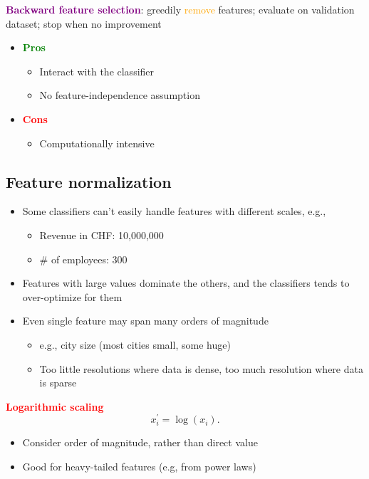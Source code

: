 \documentclass[11pt]{article}
\begin{document}
\textbf{\textcolor{purple}{Backward feature selection}}: greedily \textcolor{orange}{remove} features; evaluate on validation dataset; stop when no improvement
\begin{itemize}
	\item \textbf{\textcolor{green}{Pros}}
		\begin{itemize}
			\item Interact with the classifier
			\item No feature-independence assumption
		\end{itemize}
	\item \textcolor{red}{\textbf{Cons}}
		\begin{itemize}
			\item Computationally intensive
		\end{itemize}
\end{itemize}

\newpage
\subsection*{Feature normalization}

\begin{itemize}
	\item Some classifiers can't easily handle features with different scales, e.g., 
		\begin{itemize}
			\item Revenue in CHF: 10,000,000
			\item # of employees: 300
		\end{itemize}
	\item Features with large values dominate the others, and the classifiers tends to over-optimize for them
	\item Even single feature may span many orders of magnitude
		\begin{itemize}
			\item e.g., city size (most cities small, some huge)
			\item Too little resolutions where data is dense, too much resolution where data is sparse
		\end{itemize}
\end{itemize}

\textbf{\textcolor{red}{Logarithmic scaling}}
\[
x_i^{'} = \log(x_i)
.\] 
\begin{itemize}
	\item Consider order of magnitude, rather than direct value
	\item Good for heavy-tailed features (e.g, from power laws)
\end{itemize}
\end{document}
